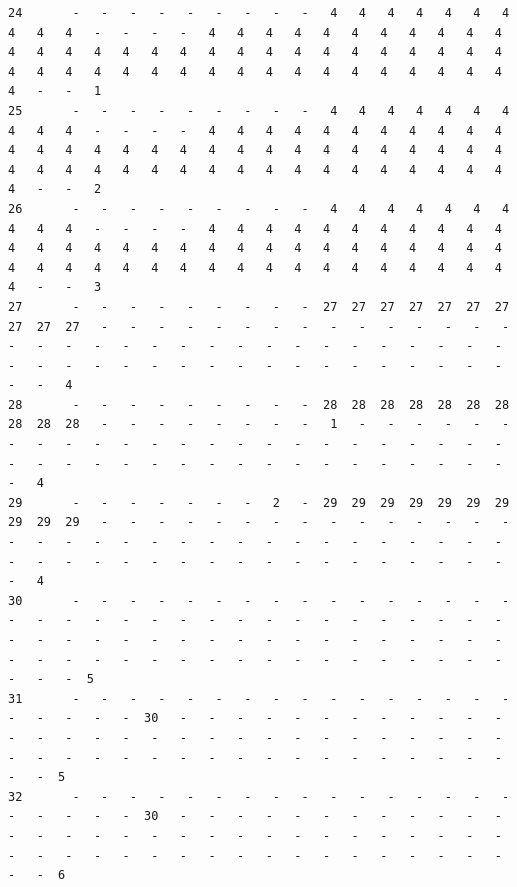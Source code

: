 \documentclass[11pt,a4paper]{article}
\begin{document}
\begin{landscape}
\begin{verbatim}
24       -   -   -   -   -   -   -   -   -   4   4   4   4   4   4   4   4   4   4   -   -   -   -   4   4   4   4   4   4   4   4   4   4   4   4   4   4   4   4   4   4   4   4   4   4   4   4   4   4   4   4   4   4   4   4   4   4   4   4   4   4   4   4   4   4   4   4   4   4   4   4   -   -   1
25       -   -   -   -   -   -   -   -   -   4   4   4   4   4   4   4   4   4   4   -   -   -   -   4   4   4   4   4   4   4   4   4   4   4   4   4   4   4   4   4   4   4   4   4   4   4   4   4   4   4   4   4   4   4   4   4   4   4   4   4   4   4   4   4   4   4   4   4   4   4   4   -   -   2
26       -   -   -   -   -   -   -   -   -   4   4   4   4   4   4   4   4   4   4   -   -   -   -   4   4   4   4   4   4   4   4   4   4   4   4   4   4   4   4   4   4   4   4   4   4   4   4   4   4   4   4   4   4   4   4   4   4   4   4   4   4   4   4   4   4   4   4   4   4   4   4   -   -   3
27       -   -   -   -   -   -   -   -   -  27  27  27  27  27  27  27  27  27  27   -   -   -   -   -   -   -   -   -   -   -   -   -   -   -   -   -   -   -   -   -   -   -   -   -   -   -   -   -   -   -   -   -   -   -   -   -   -   -   -   -   -   -   -   -   -   -   -   -   -   -   -   -   4
28       -   -   -   -   -   -   -   -   -  28  28  28  28  28  28  28  28  28  28   -   -   -   -   -   -   -   -   1   -   -   -   -   -   -   -   -   -   -   -   -   -   -   -   -   -   -   -   -   -   -   -   -   -   -   -   -   -   -   -   -   -   -   -   -   -   -   -   -   -   -   -   4
29       -   -   -   -   -   -   -   2   -  29  29  29  29  29  29  29  29  29  29   -   -   -   -   -   -   -   -   -   -   -   -   -   -   -   -   -   -   -   -   -   -   -   -   -   -   -   -   -   -   -   -   -   -   -   -   -   -   -   -   -   -   -   -   -   -   -   -   -   -   -   -   4
30       -   -   -   -   -   -   -   -   -   -   -   -   -   -   -   -   -   -   -   -   -   -   -   -   -   -   -   -   -   -   -   -   -   -   -   -   -   -   -   -   -   -   -   -   -   -   -   -   -   -   -   -   -   -   -   -   -   -   -   -   -   -   -   -   -   -   -   -   -   -   -   -   -  5
31       -   -   -   -   -   -   -   -   -   -   -   -   -   -   -   -   -   -   -   -   -  30   -   -   -   -   -   -   -   -   -   -   -   -   -   -   -   -   -   -   -   -   -   -   -   -   -   -   -   -   -   -   -   -   -   -   -   -   -   -   -   -   -   -   -   -   -   -   -   -   -   -  5
32       -   -   -   -   -   -   -   -   -   -   -   -   -   -   -   -   -   -   -   -   -  30   -   -   -   -   -   -   -   -   -   -   -   -   -   -   -   -   -   -   -   -   -   -   -   -   -   -   -   -   -   -   -   -   -   -   -   -   -   -   -   -   -   -   -   -   -   -   -   -   -   -  6

\end{verbatim}
\end{landscape}
\end{document}
